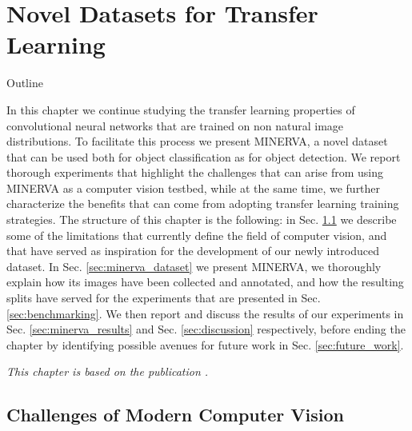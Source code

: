 \chapter{Novel Datasets for Transfer Learning}
\label{ch:minerva}

\begin{remark}{Outline}

	In this chapter we continue studying the transfer learning properties of convolutional neural networks that are trained on non natural image distributions. To facilitate this process we present MINERVA, a novel dataset that can be used both for object classification as for object detection. We report thorough experiments that highlight the challenges that can arise from using MINERVA as a computer vision testbed, while at the same time, we further characterize the benefits that can come from adopting transfer learning training strategies. The structure of this chapter is the following: in Sec. \ref{sec:cv_challenges} we describe some of the limitations that currently define the field of computer vision, and that have served as inspiration for the development of our newly introduced dataset. In Sec. \ref{sec:minerva_dataset} we present MINERVA, we thoroughly explain how its images have been collected and annotated, and how the resulting splits have served for the experiments that are presented in Sec. \ref{sec:benchmarking}. We then report and discuss the results of our experiments in Sec. \ref{sec:minerva_results} and Sec. \ref{sec:discussion} respectively, before ending the chapter by identifying possible avenues for future work in Sec. \ref{sec:future_work}. 

\vspace{5mm}
\textit{This chapter is based on the publication \citet{sabatelli2021advances}.}
\label{ch:minerva_paper}


\end{remark}


\section{Challenges of Modern Computer Vision}
\label{sec:cv_challenges}

